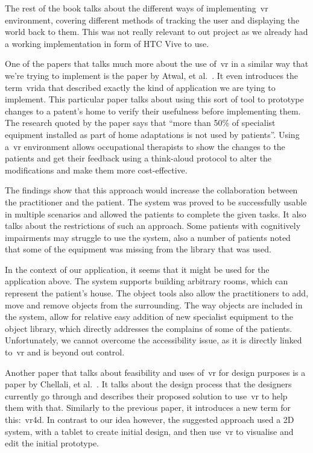 The rest of the book talks about the different ways of implementing~\acrshort{vr} environment, covering different methods of tracking the user and displaying the world back to them. This was not really relevant to out project as we already had a working implementation in form of HTC Vive to use.

One of the papers that talks much more about the use of~\acrshort{vr} in a similar way that we're trying to implement is the paper by Atwal, et al.~\cite{atwal2014}. It even introduces the term~\acrfull{vrida} that described exactly the kind of application we are tying to implement. This particular paper talks about using this sort of tool to prototype changes to a patent's home to verify their usefulness before implementing them. The research quoted by the paper says that ``more than 50\% of specialist equipment installed as part of home adaptations is not used by patients''. Using a~\acrshort{vr} environment allows occupational therapists to show the changes to the patients and get their feedback using a think-aloud protocol to alter the modifications and make them more cost-effective.

The findings show that this approach would increase the collaboration between the practitioner and the patient. The system was proved to be successfully usable in multiple scenarios and allowed the patients to complete the given tasks. It also talks about the restrictions of such an approach. Some patients with cognitively impairments may struggle to use the system, also a number of patients noted that some of the equipment was missing from the library that was used.

In the context of our application, it seems that it might be used for the application above. The system supports building arbitrary rooms, which can represent the patient's house. The object tools also allow the practitioners to add, move and remove objects from the surrounding. The way objects are included in the system, allow for relative easy addition of new specialist equipment to the object library, which directly addresses the complains of some of the patients. Unfortunately, we cannot overcome the accessibility issue, as it is directly linked to~\acrshort{vr} and is beyond out control.

Another paper that talks about feasibility and uses of~\acrshort{vr} for design purposes is a paper by Chellali, et al.~\cite{chellali2013}. It talks about the design process that the designers currently go through and describes their proposed solution to use~\acrshort{vr} to help them with that. Similarly to the previous paper, it introduces a new term for this:~\acrfull{vr4d}. In contrast to our idea however, the suggested approach used a 2D system, with a tablet to create initial design, and then use~\acrshort{vr} to visualise and edit the initial prototype.

